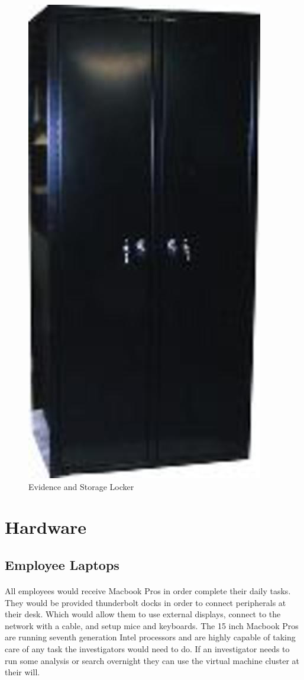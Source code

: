 \documentclass{article}
\begin{document}
\begin{figure}[H]
   \centering
       \includegraphics{figures/locker.jpg}
 \caption{Evidence and Storage Locker}
 \label{fig:Locker}
\end{figure}

\section{Hardware}

\subsection{Employee Laptops} 
\paragraph{}
All employees would receive Macbook Pros in order complete their daily tasks.
They would be provided thunderbolt docks in order to connect peripherals at their desk.
Which would allow them to use external displays, connect to the network with a cable, and setup mice and keyboards.
The 15 inch Macbook Pros are running seventh generation Intel processors and are highly capable of taking care of any task the investigators would need to do. 
If an investigator needs to run some analysis or search overnight they can use the virtual machine cluster at their will.
\end{document}
